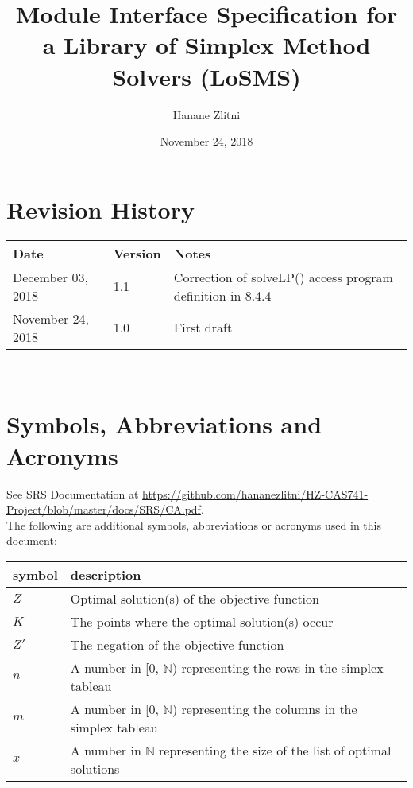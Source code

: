\documentclass[12pt, titlepage]{article}
\newcommand{\progname}{Library of Simplex Method Solvers}
\newcommand{\famname}{LoSMS}
\begin{document}
\title{Module Interface Specification for a \progname{} (\famname{})}

\author{Hanane Zlitni}

\date{November 24, 2018}

\maketitle


\section{Revision History}

\begin{tabularx}{\textwidth}{p{3cm}p{2cm}X}
\toprule {\bf Date} & {\bf Version} & {\bf Notes}\\
\midrule
December 03, 2018 & 1.1 & Correction of solveLP() access program definition in 
8.4.4\\
November 24, 2018 & 1.0 & First draft\\
\bottomrule
\end{tabularx}

~\newpage

\section{Symbols, Abbreviations and Acronyms}

See SRS Documentation at 
\url{https://github.com/hananezlitni/HZ-CAS741-Project/blob/master/docs/SRS/CA.pdf}.
 \\

The following are additional symbols, abbreviations or acronyms used in this 
document: \\

\renewcommand{\arraystretch}{1.2}
\begin{tabular}{l l} 
	\toprule		
	\textbf{symbol} & \textbf{description}\\
	\midrule 
	$Z$ & Optimal solution(s) of the objective function\\
	$K$ & The points where the optimal solution(s) occur\\
	$Z'$ & The negation of the objective function\\
	$n$ & A number in [0, $\mathbb{N}$) representing the rows in the simplex 
	tableau \\
	$m$ & A number in [0, $\mathbb{N}$) representing the columns in the 
	simplex tableau \\
	$x$ & A number in $\mathbb{N}$ representing the size of the list of 
	optimal solutions \\
	\bottomrule
\end{tabular}\\
\end{document}
